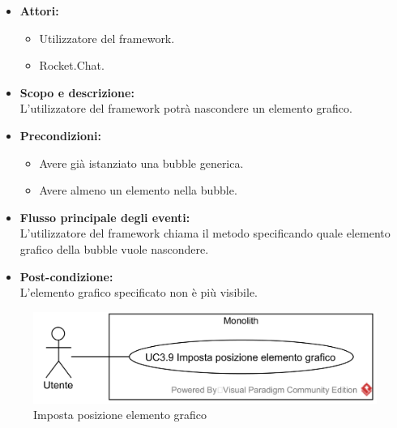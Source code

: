 \begin{itemize}
	\item \textbf{Attori:}
	\begin{itemize}
		\item Utilizzatore del framework.
		\item Rocket.Chat.
	\end{itemize}
	\item \textbf{Scopo e descrizione:} 
	\\L'utilizzatore del framework potrà nascondere un elemento grafico.
	\item \textbf{Precondizioni:}
	\begin{itemize}
		\item Avere già istanziato una bubble generica.
		\item Avere almeno un elemento nella bubble.
	\end{itemize}
	\item \textbf{Flusso principale degli eventi:}
	\\L'utilizzatore del framework chiama il metodo specificando quale elemento grafico della bubble vuole nascondere.
	\item \textbf{Post-condizione:}
	\\L'elemento grafico specificato non è più visibile.
\end{itemize}

\begin{samepage}
\nopagebreak
\begin{figure}[H]
	\centering
	\includegraphics[width=15cm]{../../documenti/AnalisiDeiRequisiti/Diagrammi_img/usecase/uc1_23.png}
	\caption{\UCFCaption{} Imposta posizione elemento grafico}
\end{figure}
\end{samepage}

